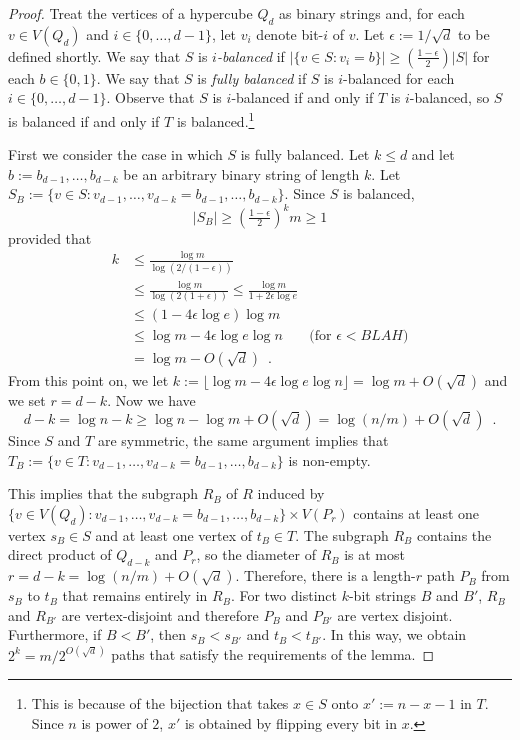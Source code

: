 \documentclass{patmorin}
\begin{document}
\begin{proof}
  Treat the vertices of a hypercube $Q_d$ as binary strings and, for each $v\in V(Q_d)$ and $i\in\{0,\ldots,d-1\}$, let $v_i$ denote bit-$i$ of $v$.
  Let $\epsilon:=1/\sqrt{d}$ to be defined shortly.
  We say that $S$ is \emph{$i$-balanced} if $|\{v\in S:v_i=b\}|\ge(\tfrac{1-\epsilon}{2})|S|$ for each $b\in\{0,1\}$.  We say that $S$ is \emph{fully balanced} if $S$ is $i$-balanced for each $i\in\{0,\ldots,d-1\}$.
  Observe that $S$ is $i$-balanced if and only if $T$ is $i$-balanced, so $S$ is balanced if and only if $T$ is balanced.\footnote{This is because of the bijection that takes $x\in S$ onto $x':=n-x-1$ in $T$. Since $n$ is power of $2$, $x'$ is obtained by flipping every bit in $x$.}

  First we consider the case in which $S$ is fully balanced.
  Let $k\le d$ and let $b:=b_{d-1},\ldots,b_{d-k}$ be an arbitrary binary string of length $k$.  Let $S_B:=\{v\in S:v_{d-1},\ldots,v_{d-k}=b_{d-1},\ldots,b_{d-k}\}$.  Since $S$ is balanced,
  \[
     |S_B|\ge \left(\tfrac{1-\epsilon}{2}\right)^k m  \ge 1
  \]
  provided that
  \begin{align*}
     k
     & \le\frac{\log m}{\log(2/(1-\epsilon))} \\
     & \le \frac{\log m}{\log(2(1+\epsilon))} \le \frac{\log m}{1+2\epsilon\log e} \\
     & \le (1-4\epsilon\log e)\log m \\
     & \le \log m - 4\epsilon\log e\log n &\text{(for $\epsilon < BLAH$)} \\
     & = \log m - O(\sqrt{d}) \enspace .
  \end{align*}
  From this point on, we let $k:=\lfloor\log m - 4\epsilon\log e\log n\rfloor=\log m + O(\sqrt{d})$ and we set $r=d-k$.
  Now we have
  \[ d-k = \log n - k
         \ge \log n - \log m + O(\sqrt{d})
         = \log(n/m)+O(\sqrt{d}) \enspace .
  \]
  Since $S$ and $T$ are symmetric, the same argument implies that $T_B:=\{v\in T: v_{d-1},\ldots,v_{d-k}=b_{d-1},\ldots,b_{d-k}\}$ is non-empty.

  This implies that the subgraph $R_B$ of $R$ induced by $\{v\in V(Q_d):v_{d-1},\ldots,v_{d-k}=b_{d-1},\ldots,b_{d-k}\}\times V(P_r)$ contains at least one vertex $s_B\in S$ and at least one vertex of $t_B\in T$.  The subgraph $R_B$ contains the direct product of $Q_{d-k}$ and $P_r$, so the diameter of $R_B$ is at most $r=d-k=\log(n/m)+O(\sqrt{d})$. Therefore, there is a length-$r$ path $P_B$ from $s_B$ to $t_B$ that remains entirely in $R_B$.  For two distinct $k$-bit strings $B$ and $B'$, $R_B$ and $R_{B'}$ are vertex-disjoint and therefore $P_B$ and $P_{B'}$ are vertex disjoint.  Furthermore, if $B< B'$, then $s_B< s_{B'}$ and $t_B < t_{B'}$. In this way, we obtain
  $2^k = m/2^{O(\sqrt{d})}$ paths that satisfy the requirements of the lemma.


\end{proof}
\end{document}
